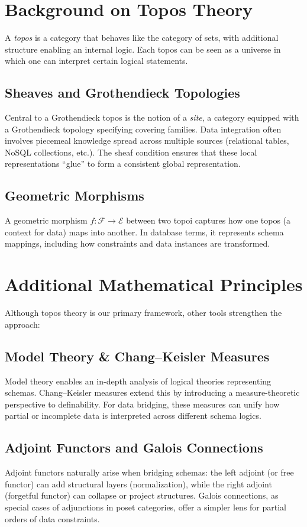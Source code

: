 \documentclass[11pt]{article}
\begin{document}
\section{Background on Topos Theory}
A \emph{topos} is a category that behaves like the category of sets, with additional structure enabling an internal logic. Each topos can be seen as a universe in which one can interpret certain logical statements. 

\subsection{Sheaves and Grothendieck Topologies}
Central to a Grothendieck topos is the notion of a \emph{site}, a category equipped with a Grothendieck topology specifying covering families. Data integration often involves piecemeal knowledge spread across multiple sources (relational tables, NoSQL collections, etc.). The sheaf condition ensures that these local representations ``glue'' to form a consistent global representation.

\subsection{Geometric Morphisms}
A geometric morphism \( f : \mathcal{F} \to \mathcal{E} \) between two topoi captures how one topos (a context for data) maps into another. In database terms, it represents schema mappings, including how constraints and data instances are transformed.

\section{Additional Mathematical Principles}
Although topos theory is our primary framework, other tools strengthen the approach:

\subsection{Model Theory \& Chang--Keisler Measures}
Model theory enables an in-depth analysis of logical theories representing schemas. Chang--Keisler measures \cite{ChangKeisler} extend this by introducing a measure-theoretic perspective to definability. For data bridging, these measures can unify how partial or incomplete data is interpreted across different schema logics.

\subsection{Adjoint Functors and Galois Connections}
Adjoint functors naturally arise when bridging schemas: the left adjoint (or free functor) can add structural layers (normalization), while the right adjoint (forgetful functor) can collapse or project structures. Galois connections, as special cases of adjunctions in poset categories, offer a simpler lens for partial orders of data constraints.
\end{document}
